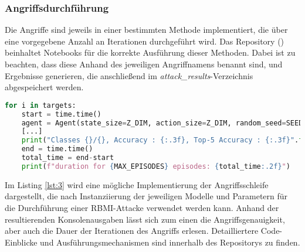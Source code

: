 \subsubsection{Angriffsdurchführung}
Die Angriffe sind jeweils in einer bestimmten Methode implementiert, die über eine vorgegebene Anzahl an Iterationen durchgeführt wird. Das Repository (\cite{weber_hosthansba_code_2024}) beinhaltet Notebooks für die korrekte Ausführung dieser Methoden. Dabei ist zu beachten, dass diese Anhand des jeweiligen Angriffnamens benannt sind, und Ergebnisse generieren, die anschließend im \textit{attack\_results}-Verzeichnis abgespeichert werden.
\begin{lstlisting}[language=Python, caption=Angriffsschleife einer RBMI-Attacke, label=lst:3]
for i in targets:
	start = time.time()
	agent = Agent(state_size=Z_DIM, action_size=Z_DIM, random_seed=SEED, hidden_size=256, action_prior="uniform")
	[...]
	print("Classes {}/{}, Accuracy : {:.3f}, Top-5 Accuracy : {:.3f}".format(total, N_TARGET, acc, acc5))
	end = time.time()
	total_time = end-start
	print(f"duration for {MAX_EPISODES} episodes: {total_time:.2f}")
\end{lstlisting}
Im Listing \ref{lst:3} wird eine mögliche Implementierung der Angriffsschleife dargestellt, die nach Instanziierung der jeweiligen Modelle und Parametern für die Durchführung einer RBMI-Attacke verwendet werden kann. Anhand der resultierenden Konsolenausgaben lässt sich zum einen die Angriffsgenauigkeit, aber auch die Dauer der Iterationen des Angriffs erlesen. Detailliertere Code-Einblicke und Ausführungsmechanismen sind innerhalb des Repositorys zu finden.